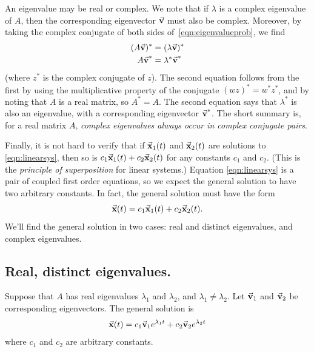 An eigenvalue may be real or complex. We note that
if $\lambda$ is a complex eigenvalue of $A$, then
the corresponding eigenvector $\vec{\textbf{v}}$ must also be
complex. Moreover, by taking the complex conjugate
of both sides of~\eqref{eqn:eigenvalueprob},
we find
\begin{equation}
\begin{split}
   (A\vec{\textbf{v}})^* & = (\lambda \vec{\textbf{v}})^* \\
   A\vec{\textbf{v}}^* & = \lambda^* \vec{\textbf{v}}^*
\end{split}
\end{equation}
(where $z^*$ is the complex conjugate of $z$).
The second equation follows from the first
by using the multiplicative property of the conjugate
$(wz)^* = w^* z^*$, and
by noting that
$A$ is a real matrix, so $A^*=A$.
The second equation says that $\lambda^*$ is also an eigenvalue,
with a corresponding eigenvector $\vec{\textbf{v}}^*$.
The short summary is, for a real matrix $A$,
\emph{complex eigenvalues always occur in complex conjugate
pairs}.

Finally, it is not hard to verify that if $\vec{\textbf{x}}_1(t)$ and
$\vec{\textbf{x}}_2(t)$ are solutions to \eqref{eqn:linearsys}, then
so is $c_1 \vec{\textbf{x}}_1(t) + c_2\vec{\textbf{x}}_2(t)$ for any constants
$c_1$ and $c_2$.
(This is the \emph{principle of superposition} for linear
systems.)
  Equation \eqref{eqn:linearsys} is
a pair of coupled first order equations, so we expect the
general solution to have two arbitrary constants.
In fact, the general solution must have the form
\begin{equation}
  \vec{\textbf{x}}(t) = c_1 \vec{\textbf{x}}_1(t) + c_2 \vec{\textbf{x}}_2(t).
\end{equation}
We'll find the general solution in two cases: real and distinct eigenvalues,
and complex eigenvalues.

\subsection*{Real, distinct eigenvalues.}
Suppose that $A$ has real eigenvalues $\lambda_1$
and $\lambda_2$, and $\lambda_1 \ne \lambda_2$.
Let $\vec{\textbf{v}}_1$ and $\vec{\textbf{v}}_2$ be corresponding eigenvectors.
The general solution is
\begin{equation}
  \vec{\textbf{x}}(t) = c_1 \vec{\textbf{v}}_1 e^{\lambda_1 t} + c_2 \vec{\textbf{v}}_2 e^{\lambda_2 t}
\label{eqn:gensolreal}
\end{equation}
where $c_1$ and $c_2$ are arbitrary constants.

